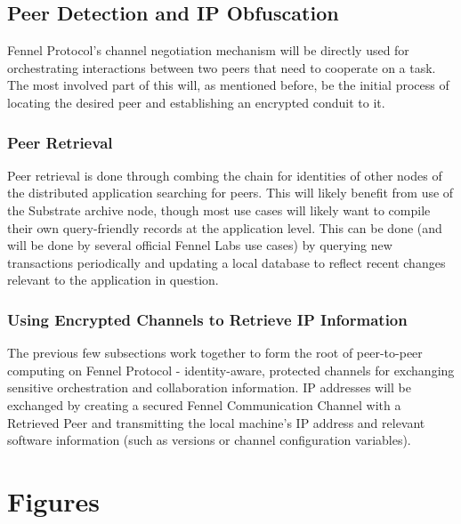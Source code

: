\documentclass[]{article}
\begin{document}
\subsection{Peer Detection and IP Obfuscation}
\label{scrivauto:52}

Fennel Protocol's channel negotiation mechanism will be directly used for orchestrating interactions between two peers that need to cooperate on a task. The most involved part of this will, as mentioned before, be the initial process of locating the desired peer and establishing an encrypted conduit to it.

\subsubsection{Peer Retrieval}
\label{scrivauto:53}

Peer retrieval is done through combing the chain for identities of other nodes of the distributed application searching for peers. This will likely benefit from use of the Substrate archive node, though most use cases will likely want to compile their own query-friendly records at the application level. This can be done (and will be done by several official Fennel Labs use cases) by querying new transactions periodically and updating a local database to reflect recent changes relevant to the application in question.

\subsubsection{Using Encrypted Channels to Retrieve IP Information}
\label{scrivauto:54}

The previous few subsections work together to form the root of peer-to-peer computing on Fennel Protocol - identity-aware, protected channels for exchanging sensitive orchestration and collaboration information. IP addresses will be exchanged by creating a secured Fennel Communication Channel with a Retrieved Peer and transmitting the local machine's IP address and relevant software information (such as versions or channel configuration variables).

\section{Figures}
\label{scrivauto:57}
\end{document}
